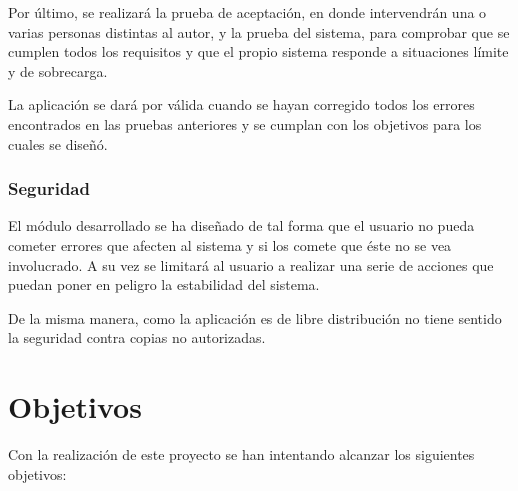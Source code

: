 Por último, se realizará la prueba de aceptación, en donde intervendrán una o varias personas distintas al autor, y la prueba del sistema, para comprobar que se cumplen todos los requisitos y que el propio sistema responde a situaciones límite y de sobrecarga.

La aplicación se dará por válida cuando se hayan corregido todos los errores encontrados en las pruebas anteriores y se cumplan con los objetivos para los cuales se diseñó.

\subsubsection{Seguridad}

El módulo desarrollado se ha diseñado de tal forma que el usuario no pueda cometer errores que afecten al sistema y si los comete que éste no se vea involucrado. A su vez se limitará al usuario a realizar una serie de acciones que puedan poner en peligro la estabilidad del sistema.

De la misma manera, como la aplicación es de libre distribución no tiene sentido la seguridad contra copias no autorizadas.

\newpage

\section{Objetivos}

Con la realización de este proyecto se han intentando alcanzar los siguientes objetivos:

